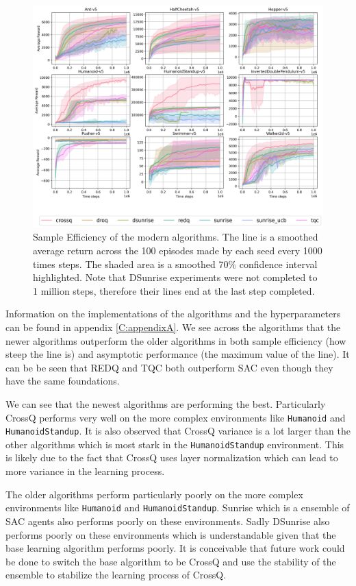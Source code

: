 \begin{figure}[H]
    \centering
    \includegraphics[width=\textwidth]{figures/modern_results.png}
    \caption{Sample Efficiency of the modern algorithms. The line is a smoothed average return across the 100 episodes made by each seed every 1000 times steps. The shaded area is a smoothed 70\% confidence interval highlighted. Note that DSunrise experiments were not completed to 1 million steps, therefore their lines end at the last step completed.}
    \label{fig:sample_efficiency_modern}
\end{figure}

Information on the implementations of the algorithms and the hyperparameters can be found in appendix \ref{C:appendixA}. We see across the algorithms that the newer algorithms outperform the older algorithms in both sample efficiency (how steep the line is) and asymptotic performance (the maximum value of the line). It can be be seen that REDQ and TQC both outperform SAC even though they have the same foundations.

We can see that the newest algorithms are performing the best. Particularly CrossQ performs very well on the more complex environments like \texttt{Humanoid} and \texttt{HumanoidStandup}. It is also observed that CrossQ variance is a lot larger than the other algorithms which is most stark in the \texttt{HumanoidStandup} environment. This is likely due to the fact that CrossQ uses layer normalization which can lead to more variance in the learning process.

The older algorithms perform particularly poorly on the more complex environments like \texttt{Humanoid} and \texttt{HumanoidStandup}. Sunrise which is a ensemble of SAC agents also performs poorly on these environments. Sadly DSunrise also performs poorly on these environments which is understandable given that the base learning algorithm performs poorly. It is conceivable that future work could be done to switch the base algorithm to be CrossQ and use the stability of the ensemble to stabilize the learning process of CrossQ.

